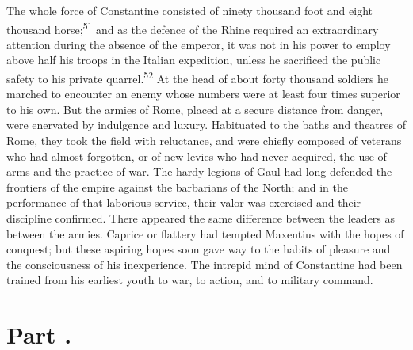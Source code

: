 The whole force of Constantine consisted of ninety thousand foot
and eight thousand horse;\textsuperscript{51} and as the defence of the Rhine
required an extraordinary attention during the absence of the
emperor, it was not in his power to employ above half his troops
in the Italian expedition, unless he sacrificed the public safety
to his private quarrel.\textsuperscript{52} At the head of about forty thousand
soldiers he marched to encounter an enemy whose numbers were at
least four times superior to his own. But the armies of Rome,
placed at a secure distance from danger, were enervated by
indulgence and luxury. Habituated to the baths and theatres of
Rome, they took the field with reluctance, and were chiefly
composed of veterans who had almost forgotten, or of new levies
who had never acquired, the use of arms and the practice of war.
The hardy legions of Gaul had long defended the frontiers of the
empire against the barbarians of the North; and in the
performance of that laborious service, their valor was exercised
and their discipline confirmed. There appeared the same
difference between the leaders as between the armies. Caprice or
flattery had tempted Maxentius with the hopes of conquest; but
these aspiring hopes soon gave way to the habits of pleasure and
the consciousness of his inexperience. The intrepid mind of
Constantine had been trained from his earliest youth to war, to
action, and to military command.



\section{Part \thesection.}

